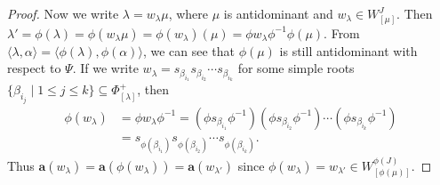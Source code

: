 \documentclass[10pt,a4paper]{amsart}
\newcommand{\aff}{ \mathbf{a} }
\newcommand{\lam}{\lambda}
\newcommand{\lest}{\leqslant}
\renewcommand{\subset}{\subseteq}
\begin{document}
\begin{proof}
Now  we write $\lambda=w_{\lambda}\mu$, where $\mu$ is antidominant and $w_{\lambda}\in W_{[\mu]}^J$. Then $\lam'=\phi(\lam)=\phi(w_{\lambda}\mu)=\phi(w_{\lambda})(\mu)=\phi w_{\lambda}\phi ^{-1}\phi(\mu)$. From $\langle \lam, \alpha\rangle=\langle \phi(\lam),\phi(\alpha)\rangle$, we can see that $\phi(\mu)$ is still antidominant with respect to $\Psi$. If we write $w_{\lam}=s_{\beta_{i_1}}s_{\beta_{i_2}}\cdots s_{\beta_{i_k}}$ for some simple roots $\{\beta_{i_j}\mid 1\lest j\lest k\}\subset \Phi_{[\lam]}^+$, then \begin{align*}
   \phi(w_{\lam})&= \phi w_{\lam}\phi^{-1}=(\phi s_{\beta_{i_1}}\phi ^{-1})(\phi s_{\beta_{i_2}}\phi ^{-1})\cdots (\phi s_{\beta_{i_k}}\phi ^{-1})\\
    &=s_{\phi(\beta_{i_1})}s_{\phi(\beta_{i_2})}\cdots s_{\phi(\beta_{i_k})}.
\end{align*}
Thus $\aff(w_{\lam})=\aff(\phi(w_{\lam}))=\aff(w_{\lam'})$ since $\phi(w_{\lam})=w_{\lam'}\in W_{[\phi(\mu)]}^{\phi(J)}$.
\end{proof}
\end{document}
